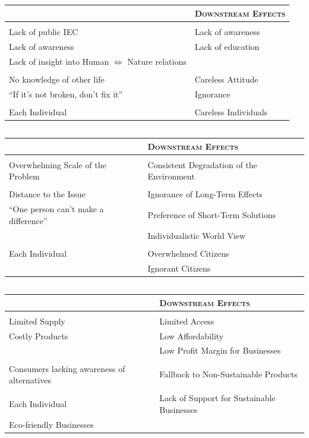 \documentclass{article}
\newenvironment{SATAnalysis}{
  \vspace{0.25cm}
  \begin{tabular}{>{\raggedright\arraybackslash}p{0.45\textwidth} >{\raggedleft\arraybackslash}p{0.45\textwidth}}
  {\Large \textsc{Upstream Causes}} & {\Large \textsc{Downstream Effects}}\\
}{
  \bottomrule
  \end{tabular}
  \vspace{0.5cm}
}
\newcommand{\SATStructural}{\midrule\multicolumn{2}{c}{\Large \textsc{Structural}}\\ \midrule}
\newcommand{\SATAttitudinal}{\midrule\multicolumn{2}{c}{\Large \textsc{Attitudinal}}\\ \midrule}
\newcommand{\SATTransactional}{\midrule\multicolumn{2}{c}{\Large \textsc{Transactional}}\\ \midrule}
\newcommand{\SATEffect}[1]{ & #1\\}
\newcommand{\SATCauseEffect}[2]{#1 & #2\\}
\begin{document}
\subsection{}
\begin{SATAnalysis}
  \SATStructural
  \SATCauseEffect{Lack of public IEC}{Lack of awareness}
  \SATCauseEffect{Lack of awareness}{Lack of education}
  \SATCauseEffect{Lack of insight into Human $\Leftrightarrow$ Nature relations}{}
  \SATAttitudinal
  \SATCauseEffect{No knowledge of other life}{Careless Attitude}
  \SATCauseEffect{``If it's not broken, don't fix it''}{Ignorance}
  \SATTransactional
  \SATCauseEffect{Each Individual}{Careless Individuals}
\end{SATAnalysis}

\subsection{}
\begin{SATAnalysis}
  \SATStructural
  \SATCauseEffect{Overwhelming Scale of the Problem}{Consistent Degradation of the Environment}
  \SATAttitudinal
  \SATCauseEffect{Distance to the Issue}{Ignorance of Long-Term Effects}
  \SATCauseEffect{``One person can't make a difference''}{Preference of Short-Term Solutions}
  \SATEffect{Individualistic World View}
  \SATTransactional
  \SATCauseEffect{Each Individual}{Overwhelmed Citizens}
  \SATEffect{Ignorant Citizens}
\end{SATAnalysis}

\subsection{}
\begin{SATAnalysis}
  \SATStructural
  \SATCauseEffect{Limited Supply}{Limited Access}
  \SATCauseEffect{Costly Products}{Low Affordability}
  \SATEffect{Low Profit Margin for Businesses}
  \SATAttitudinal
  \SATCauseEffect{Consumers lacking awareness of alternatives}{Fallback to Non-Sustainable Products}
  \SATTransactional
  \SATCauseEffect{Each Individual}{Lack of Support for Sustainable Businesses}
  \SATCauseEffect{Eco-friendly Businesses}{}
\end{SATAnalysis}
\end{document}

